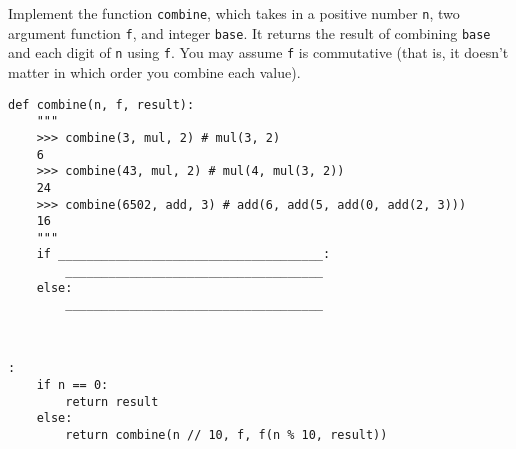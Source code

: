 \begin{blocksection}
\question Implement the function \texttt{combine}, which takes in a positive number \texttt{n}, two argument function \texttt{f}, and integer \texttt{base}. It returns the result of combining \texttt{base} and each digit of \texttt{n} using \texttt{f}. You may assume \texttt{f} is commutative (that is, it doesn't matter in which order you combine each value). \\

\begin{lstlisting}
def combine(n, f, result):
    """
    >>> combine(3, mul, 2) # mul(3, 2)
    6
    >>> combine(43, mul, 2) # mul(4, mul(3, 2))
    24
    >>> combine(6502, add, 3) # add(6, add(5, add(0, add(2, 3)))
    16
    """
    if _____________________________________:
        ____________________________________
    else:
        ____________________________________

				
\end{lstlisting}

\begin{solution}[1in]
\begin{lstlisting}:
    if n == 0:
        return result
    else:
        return combine(n // 10, f, f(n % 10, result))
\end{lstlisting}
\end{solution}
\end{blocksection}
